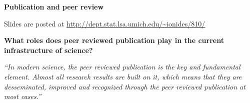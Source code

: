 \documentclass[portrait,11pt]{seminar}
\begin{document}
\bs

{\bf
Publication and peer review

Slides are posted at \url{http://dept.stat.lsa.umich.edu/~ionides/810/}
}

\medskip

{\bf  What roles does peer reviewed publication play in the current infrastructure of science? }

{\it ``In modern science, the peer reviewed publication is the key and fundamental element. Almost all research results are built on it, which means that they are desseminated, improved and recognized through the peer reviewed publication at most cases.''}








\end{document}

